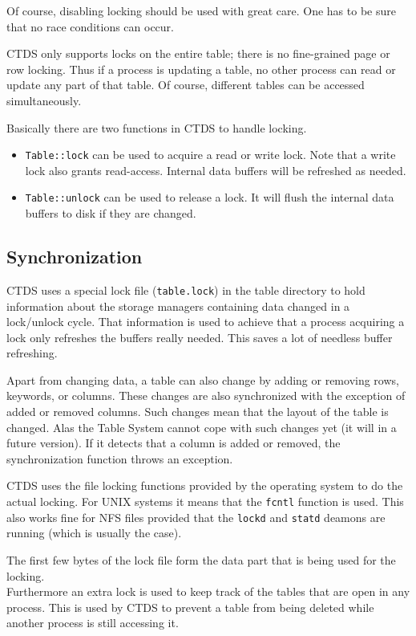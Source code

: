Of course, disabling locking should be used with great care. One has
to be sure that no race conditions can occur.

\medskip
CTDS only supports locks on the entire table; there is
no fine-grained page or row locking. Thus if a process is updating a
table, no other process can read or update any part of that table.
Of course, different tables can be accessed simultaneously.

\medskip
Basically there are two functions in CTDS to handle
locking.
\begin{itemize}
\item \texttt{Table::lock} can be used to acquire a read or write
lock. Note that a write lock also grants read-access.
Internal data buffers will be refreshed as needed.
\item \texttt{Table::unlock} can be used to release a lock.
It will flush the internal data buffers to disk if they are changed.
\end{itemize}

\subsection{Synchronization}
CTDS uses a special lock file (\texttt{table.lock}) in the table
directory to hold information about the storage managers containing
data changed in a lock/unlock cycle. That information is used to
achieve that a process acquiring a lock only refreshes the buffers
really needed. This saves a lot of needless buffer refreshing.

Apart from changing data, a table can also change by adding or
removing rows, keywords, or columns. These changes are also
synchronized with the exception of added or removed columns. Such
changes mean that the layout of the table is changed. Alas the Table
System cannot cope with such changes yet (it will in a future
version). If it detects that a column is added or removed, the
synchronization function throws an exception.

\medskip
CTDS uses the file locking functions provided by the
operating system
to do the actual locking. For UNIX systems it means that the
\texttt{fcntl} function is used. This also works fine for NFS files
provided that the \texttt{lockd} and \texttt{statd} deamons are
running (which is usually the case).

The first few bytes of the lock file form the data part
that is being used for the locking.
\\Furthermore an extra lock is used to keep track of the tables that are
open in any process. This is used by CTDS to prevent
a table from being deleted while another process is still accessing
it.

